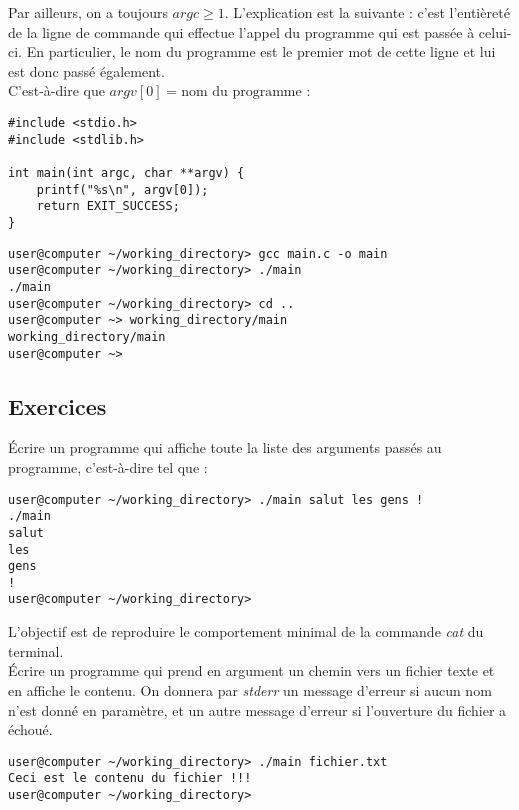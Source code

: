 \documentclass[../../../main.tex]{subfiles}
\begin{document}
Par ailleurs, on a toujours $argc \geq 1$. L'explication est la suivante : c'est l'entièreté de la ligne de commande qui effectue l'appel du programme qui est passée à celui-ci. En particulier, le nom du programme est le premier mot de cette ligne et lui est donc passé également.\\
C'est-à-dire que $argv[0] = \text{nom du programme}$ :
\begin{verbatim}
#include <stdio.h>
#include <stdlib.h>

int main(int argc, char **argv) {
	printf("%s\n", argv[0]);
	return EXIT_SUCCESS;
}
\end{verbatim}
\begin{verbatim}
user@computer ~/working_directory> gcc main.c -o main
user@computer ~/working_directory> ./main
./main
user@computer ~/working_directory> cd ..
user@computer ~> working_directory/main
working_directory/main
user@computer ~> 
\end{verbatim}
\subsection{Exercices}
 Écrire un programme qui affiche toute la liste des arguments passés au programme, c'est-à-dire tel que :
\begin{verbatim}
user@computer ~/working_directory> ./main salut les gens !
./main
salut
les
gens
!
user@computer ~/working_directory>
\end{verbatim}
 L'objectif est de reproduire le comportement minimal de la commande \textit{cat} du terminal. \\
Écrire un programme qui prend en argument un chemin vers un fichier texte et en affiche le contenu. On donnera par \textit{stderr} un message d'erreur si aucun nom n'est donné en paramètre, et un autre message d'erreur si l'ouverture du fichier a échoué.
\begin{verbatim}
user@computer ~/working_directory> ./main fichier.txt
Ceci est le contenu du fichier !!!
user@computer ~/working_directory>
\end{verbatim}
\end{document}
